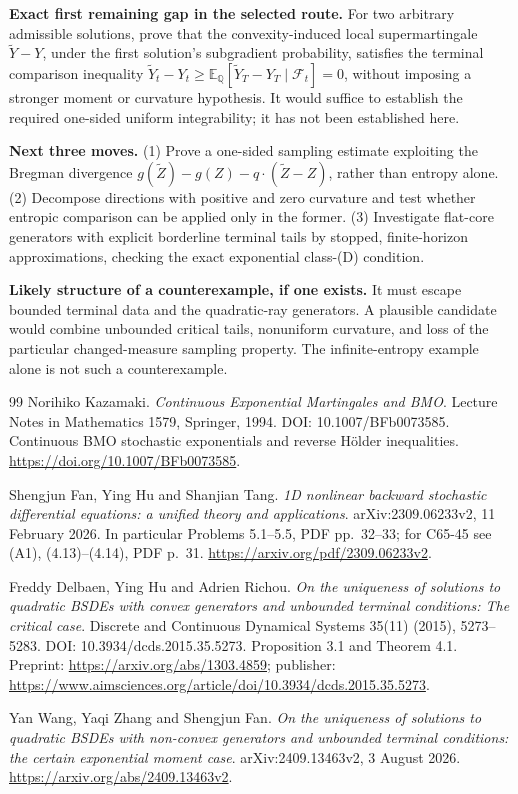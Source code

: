 \documentclass[11pt,a4paper]{article}
\newcommand{\E}{\mathbb E}
\newcommand{\Q}{\mathbb Q}
\newcommand{\F}{\mathcal F}
\theoremstyle{definition}
\begin{document}
\textbf{Exact first remaining gap in the selected route.} For two arbitrary admissible solutions, prove that the convexity-induced local supermartingale $\widetilde Y-Y$, under the first solution's subgradient probability, satisfies the terminal comparison inequality $\widetilde Y_t-Y_t\ge\E_{\Q}[\widetilde Y_T-Y_T\mid\F_t]=0$, without imposing a stronger moment or curvature hypothesis. It would suffice to establish the required one-sided uniform integrability; it has not been established here.

\textbf{Next three moves.} (1) Prove a one-sided sampling estimate exploiting the Bregman divergence $g(\widetilde Z)-g(Z)-q\cdot(\widetilde Z-Z)$, rather than entropy alone. (2) Decompose directions with positive and zero curvature and test whether entropic comparison can be applied only in the former. (3) Investigate flat-core generators with explicit borderline terminal tails by stopped, finite-horizon approximations, checking the exact exponential class-(D) condition.

\textbf{Likely structure of a counterexample, if one exists.} It must escape bounded terminal data and the quadratic-ray generators. A plausible candidate would combine unbounded critical tails, nonuniform curvature, and loss of the particular changed-measure sampling property. The infinite-entropy example alone is not such a counterexample.

\clearpage
\begin{thebibliography}{99}
Norihiko Kazamaki. \emph{Continuous Exponential Martingales and BMO}. Lecture Notes in Mathematics 1579, Springer, 1994. DOI: 10.1007/BFb0073585. Continuous BMO stochastic exponentials and reverse H\"older inequalities. \url{https://doi.org/10.1007/BFb0073585}.

Shengjun Fan, Ying Hu and Shanjian Tang. \emph{1D nonlinear backward stochastic differential equations: a unified theory and applications}. arXiv:2309.06233v2, 11 February 2026. In particular Problems 5.1--5.5, PDF pp.\ 32--33; for C65-45 see (A1), (4.13)--(4.14), PDF p.\ 31. \url{https://arxiv.org/pdf/2309.06233v2}.

Freddy Delbaen, Ying Hu and Adrien Richou. \emph{On the uniqueness of solutions to quadratic BSDEs with convex generators and unbounded terminal conditions: The critical case}. Discrete and Continuous Dynamical Systems 35(11) (2015), 5273--5283. DOI: 10.3934/dcds.2015.35.5273. Proposition 3.1 and Theorem 4.1. Preprint: \url{https://arxiv.org/abs/1303.4859}; publisher: \url{https://www.aimsciences.org/article/doi/10.3934/dcds.2015.35.5273}.

Yan Wang, Yaqi Zhang and Shengjun Fan. \emph{On the uniqueness of solutions to quadratic BSDEs with non-convex generators and unbounded terminal conditions: the certain exponential moment case}. arXiv:2409.13463v2, 3 August 2026. \url{https://arxiv.org/abs/2409.13463v2}.

\end{thebibliography}
\end{document}
